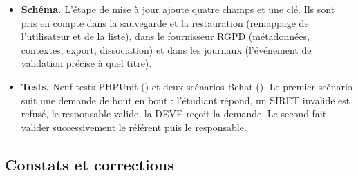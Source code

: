 \documentclass[11pt,a4paper]{article}
\begin{document}
\begin{itemize}
    validateurs simultanés sont sérialisés, et un refus intercalé n'est pas effacé.
  \item \textbf{Schéma.} L'étape de mise à jour  ajoute quatre champs et une clé.
    Ils sont pris en compte dans la sauvegarde et la restauration (remappage de l'utilisateur et
    de la liste), dans le fournisseur RGPD (métadonnées, contextes, export, dissociation) et dans
    les journaux (l'événement de validation précise à quel titre).
  \item \textbf{Tests.} Neuf tests PHPUnit () et deux scénarios
    Behat (). Le premier scénario suit une demande de bout en
    bout : l'étudiant répond, un SIRET invalide est refusé, le responsable valide, la DEVE reçoit
    la demande. Le second fait valider successivement le référent puis le responsable.
\end{itemize}

\subsection{Constats et corrections}
\end{document}
